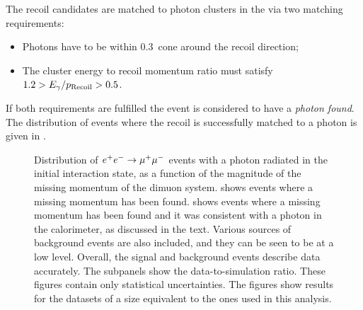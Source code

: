 The recoil candidates are matched to photon clusters in the \ECL via two matching requirements:
\begin{itemize}
    \item Photons have to be within 0.3~\rad cone around the recoil direction;
    \item The cluster energy to recoil momentum ratio must satisfy $1.2>E_{\gamma}/{p_{\mathrm{Recoil}}}>0.5$.
\end{itemize}
If both requirements are fulfilled the event is considered to have a \textit{photon found}.
The distribution of events where the recoil is successfully matched to a photon is given in .
\begin{figure}[htbp!]
    \centering
    \caption{\label{fig:normalisation_data_mc} Distribution of $e^+e^-\rightarrow\mu^+\mu^-$ events with a photon radiated in the initial interaction state, as a function of the magnitude of the missing momentum of the dimuon system.
     shows events where a missing momentum has been found.
     shows events where a missing momentum has been found and it was consistent with a photon in the calorimeter, as discussed in the text.
    Various sources of background events are also included, and they can be seen to be at a low level.
    Overall, the signal and background events describe data accurately.
    The subpanels show the data-to-simulation ratio.
    These figures contain only statistical uncertainties.
    The figures show results for the datasets of a size equivalent to the ones used in this analysis.
    }
\end{figure}

